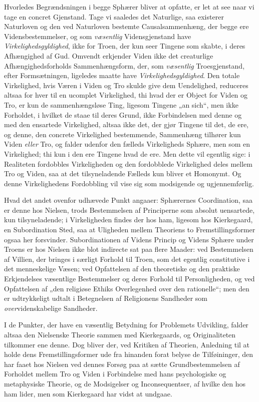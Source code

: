 \documentclass[12pt,a4paper]{book}
\newcommand{\opage}[1]{\marginnote{\footnotesize\textit{[#1]}}}
\begin{document}
Hvorledes Begrændsningen i begge Sphærer bliver at opfatte, er let at see naar
vi tage en concret Gjenstand. Tage vi saaledes det Naturlige, saa existerer
Naturloven og den ved Naturloven bestemte Causalsammenhæng, der begge ere
Vidensbestemmelser, og som \emph{væsentlig} Vidensgjenstand have \emph{Virkelighedsgyldighed},
ikke for Troen, der kun seer Tingene som skabte, i deres Afhængighed af Gud.
Omvendt erkjender Viden ikke det creaturlige Afhængighedsforholds
Sammenhængsform, der, som \emph{væsentlig} Troesgjenstand, efter Formsætningen,
ligeledes maatte have \emph{Virkelighedsgyldighed}. Den totale Virkelighed, hvis Væren
i Viden og Tro skulde give dem Uendelighed, reduceres altsaa for hver til en
ucomplet Virkelighed, thi hvad der er Object for Viden og Tro, er kun de
sammenhængsløse Ting, ligesom Tingene „an sich“, men ikke Forholdet, i hvilket
de staae til deres Grund, ikke Forbindelsen med denne og med den ensartede
Virkelighed, altsaa ikke det, der gjør Tingene til det, de ere, og denne, den
concrete Virkelighed bestemmende, Sammenhæng tilhører kun Viden \emph{eller} Tro, og
falder udenfor den fælleds Virkeligheds Sphære, men som en Virkelighed; thi kun
i den ere Tingene hvad de ere. Men dette vil egentlig sige: i Realiteten
fordobbles Virkeligheden og den fordobblede Virkelighed deles mellem Tro og
Viden, saa at det tilsyneladende Fælleds kun bliver et Homonymt. Og denne
Virkelighedens Fordobbling vil vise sig som modsigende og ugjennemførlig.

Hvad det andet ovenfor udhævede Punkt angaaer: Sphærernes Coordination, saa er
denne hos Nielsen, trods Bestemmelsen af Principerne som absolut uensartede, kun
tilsyneladende; i Virkeligheden findes der hos ham, ligesom hos Kierkegaard, en
Subordination Sted, saa at Uligheden \opage{30}mellem Theoriens to Fremstillingsformer
ogsaa her forsvinder. Subordinationen af Videns Princip og Videns Sphære under
Troens er hos Nielsen ikke blot indirecte sat paa flere Maader: ved Bestemmelsen
af Villien, der bringes i særligt Forhold til Troen, som det egentlig
constitutive i det menneskelige Væsen; ved Opfattelsen af den theoretiske og den
praktiske Erkjendelses væsentlige Bestemmelser og deres Forhold til
Personligheden, og ved Opfattelsen af „den religiøse Ethiks Overlegenhed over
den rationelle“; men den er udtrykkeligt udtalt i Betegnelsen af Religionens
Sandheder som \emph{over}videnskabelige Sandheder.

I de Punkter, der have en væsentlig Betydning for Problemets Udvikling, falder
altsaa den Nielsenske Theorie sammen med Kierkegaards, og Originaliteten
tilkommer ene denne. Dog bliver der, ved Kritiken af Theorien, Anledning til at
holde dens Fremstillingsformer ude fra hinanden forat belyse de Tilføininger,
den har faaet hos Nielsen ved dennes Forsøg paa at sætte Grundbestemmelsen af
Forholdet mellem Tro og Viden i Forbindelse med hans psychologiske og
metaphysiske Theorie, og de Modsigelser og Inconsequentser, af hvilke den hos
ham lider, men som Kierkegaard har vidst at undgaae.
\end{document}
